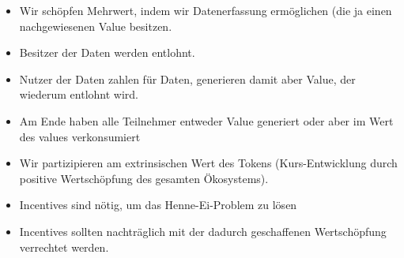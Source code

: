 \begin{Fazit}

\begin{itemize}
  \item Wir schöpfen Mehrwert, indem wir Datenerfassung ermöglichen (die ja einen nachgewiesenen Value besitzen. 
  \item Besitzer der Daten werden entlohnt.
  \item Nutzer der Daten zahlen für Daten, generieren damit aber Value, der wiederum entlohnt wird.
  \item Am Ende haben alle Teilnehmer entweder Value generiert oder aber im Wert des values verkonsumiert
  \item Wir partizipieren am extrinsischen Wert des Tokens (Kurs-Entwicklung durch positive Wertschöpfung des gesamten Ökosystems).
  \item Incentives sind nötig, um das Henne-Ei-Problem zu lösen
  \item Incentives sollten nachträglich mit der dadurch geschaffenen Wertschöpfung verrechtet werden. 
\end{itemize}

\end{Fazit}

\vspace{0.3cm}

